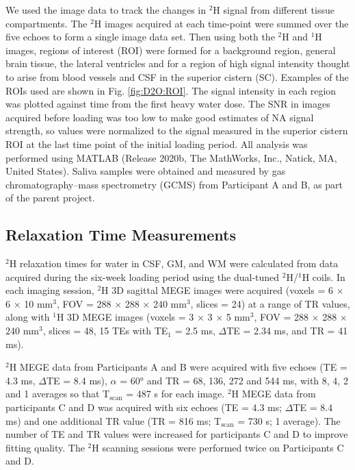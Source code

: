 We used the image data to track the changes in $^2$H signal from different tissue compartments. The $^2$H images acquired at each time-point were summed over the five echoes to form a single image data set. Then using both the $^2$H and $^1$H images, regions of interest (ROI) were formed for a background region, general brain tissue, the lateral ventricles and for a region of high signal intensity thought to arise from blood vessels and \ac{CSF} in the superior cistern (SC). Examples of the \ac{ROI}s used are shown in Fig. \ref{fig:D2O:ROI}. The signal intensity in each region was plotted against time from the first heavy water dose. The \ac{SNR} in images acquired before loading was too low to make good estimates of \ac{NA} signal strength, so values were normalized to the signal measured in the superior cistern \ac{ROI} at the last time point of the initial loading period. All analysis was performed using MATLAB (Release 2020b, The MathWorks, Inc., Natick, MA, United States). Saliva samples were obtained and measured by gas chromatography–mass spectrometry (GCMS) from Participant A and B, as part of the parent project.

\subsection{Relaxation Time Measurements}
\label{Chap:D2O:Relaxation}

$^2$H relaxation times for water in \ac{CSF}, \ac{GM}, and \ac{WM} were calculated from data acquired during the six-week loading period using the dual-tuned $^2$H/$^1$H coils. In each imaging session, $^2$H 3D sagittal \ac{MEGE} images were acquired (voxels = 6 $\times$ 6 $\times$ 10 mm$^3$, \ac{FOV} = 288 $\times$ 288 $\times$ 240 mm$^3$, slices = 24) at a range of \ac{TR} values, along with $^1$H 3D \ac{MEGE} images (voxels = 3 $\times$ 3 $\times$ 5 mm$^3$, \ac{FOV} = 288 $\times$ 288 $\times$ 240 mm$^3$, slices = 48, 15 \ac{TE}s with TE$_1$ = 2.5 ms, $\Delta$TE = 2.34 ms, and TR = 41 ms). 

$^2$H \ac{MEGE} data from Participants A and B were acquired with five echoes (\ac{TE} = 4.3 ms, $\Delta$TE = 8.4 ms), $\alpha$ = 60° and \ac{TR} = 68, 136, 272 and 544 ms, with 8, 4, 2 and 1 averages so that T$_\text{scan}$ = 487 s for each image. $^2$H \ac{MEGE} data from participants C and D was acquired with six echoes (\ac{TE} = 4.3 ms; $\Delta$TE = 8.4 ms) and one additional \ac{TR} value (TR = 816 ms; T$_\text{scan}$ = 730 s; 1 average). 
The number of \ac{TE} and \ac{TR} values were increased for participants C and D to improve fitting quality. The $^2$H scanning sessions were performed twice on Participants C and D.

